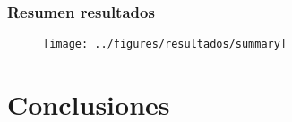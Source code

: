 \documentclass[mathserif]{beamer}
\begin{document}
\begin{frame}
\frametitle{Resumen resultados}

\begin{figure}
\texttt{[image: ../figures/resultados/summary]}
\end{figure}




\end{frame}

\section{Conclusiones}
\end{document}
